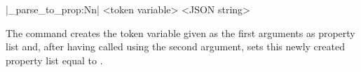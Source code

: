 \documentclass[a4paper]{article}
\begin{document}
\begin{macrodef}
|\jsonparse_parse_to_prop:Nn| <token variable> {<JSON string>}
\end{macrodef}
The command  creates the token variable given as the first arguments as property list and, after having called  using the second argument, sets this newly created property list equal to .


\printchanges
\end{document}
